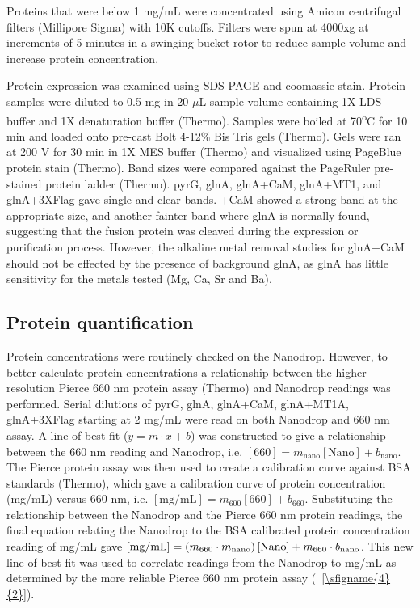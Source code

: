 \documentclass[../main/main]{subfiles}
\begin{document}
Proteins that were below 1 mg/mL were concentrated using Amicon centrifugal filters (Millipore Sigma) with 10K cutoffs. Filters were spun at 4000xg at increments of 5 minutes in a swinging-bucket rotor to reduce sample volume and increase protein concentration.

Protein expression was examined using SDS-PAGE and coomassie stain. Protein samples were diluted to 0.5 mg in 20 $\mu$L sample volume containing 1X LDS buffer and 1X denaturation buffer (Thermo). Samples were boiled at 70\textsuperscript{o}C for 10 min and loaded onto pre-cast Bolt 4-12\% Bis Tris gels (Thermo). Gels were ran at 200 V for 30 min in 1X MES buffer (Thermo) and visualized using PageBlue protein stain (Thermo). Band sizes were compared against the PageRuler pre-stained protein ladder (Thermo). pyrG, glnA, glnA+CaM, glnA+MT1, and glnA+3XFlag gave single and clear bands. +CaM showed a strong band at the appropriate size, and another fainter band where glnA is normally found, suggesting that the fusion protein was cleaved during the expression or purification process. However, the alkaline metal removal studies for glnA+CaM should not be effected by the presence of background glnA, as glnA has little sensitivity for the metals tested (Mg, Ca, Sr and Ba).

\subsection*{Protein quantification}
Protein concentrations were routinely checked on the Nanodrop. However, to better calculate protein concentrations a relationship between the higher resolution Pierce 660 nm protein assay (Thermo) and Nanodrop readings was performed. Serial dilutions of pyrG, glnA, glnA+CaM, glnA+MT1A, glnA+3XFlag starting at 2 mg/mL were read on both Nanodrop and 660 nm assay. A line of best fit
($y = m \cdot x + b$)
was constructed to give a relationship between the 660 nm reading and Nanodrop,
i.e. $[\text{660}] = m_\text{nano} [\text{Nano}] + b_{\text{nano}}$.
The Pierce protein assay was then used to create a calibration curve against BSA standards (Thermo), which gave a calibration curve of protein concentration (mg/mL) versus 660 nm,
i.e. $[\text{mg/mL}] = m_{\text{600}} [\text{660}] + b_{\text{660}}$.
Substituting the relationship between the Nanodrop and the Pierce 660 nm protein readings, the final equation relating the Nanodrop to the BSA calibrated protein concentration reading of mg/mL gave
$[\text{mg/mL}] = \left( m_{\text{660}} \cdot m_\text{\text{nano}} \right) [\text{Nano}] + m_{\text{\text{660}}} \cdot b_{\text{nano}}$.
This new line of best fit was used to correlate readings from the Nanodrop to mg/mL as determined by the more reliable Pierce 660 nm protein assay (\sFIGURE~\ref{\sfigname{4}{2}}).
\end{document}
